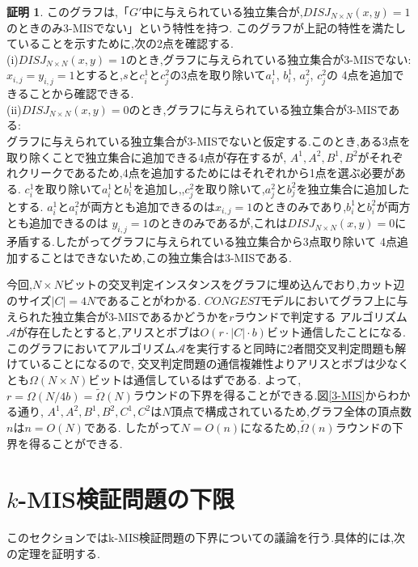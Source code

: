 \documentclass[12]{thesis}
\theoremstyle{definition}
\newtheorem*{prf*}{証明}
\begin{document}
\begin{prf*}
このグラフは,「$G'$中に与えられている独立集合が,$DISJ_{N \times N} (x, y) = 1$のときのみ3-MISでない」という特性を持つ. 
このグラフが上記の特性を満たしていることを示すために,次の2点を確認する. \\
(i)$DISJ_{N \times N} (x, y) = 1$のとき,グラフに与えられている独立集合が3-MISでない: \\
$x_{i, j} = y_{i, j} =1$とすると,$s$と$c_{i}^{1}$と$c_{j}^{2}$の3点を取り除いて$a_{i}^{1}$, $b_{i}^{1}$, $a_{j}^{2}$, $c_{j}^{2}$の
4点を追加できることから確認できる. \\
(ii)$DISJ_{N \times N} (x, y) = 0$のとき,グラフに与えられている独立集合が3-MISである: \\ 
グラフに与えられている独立集合が3-MISでないと仮定する.このとき,ある3点を取り除くことで独立集合に追加できる4点が存在するが,
$A^{1}, A^{2}, B^{1}, B^{2}$がそれぞれクリークであるため,4点を追加するためにはそれぞれから1点を選ぶ必要がある.
$c_{i}^{1}$を取り除いて$a_{i}^{1}$と$b_{i}^{1}$を追加し,,$c_{j}^{2}$を取り除いて,$a_{j}^{2}$と$b_{j}^{2}$を独立集合に追加したとする.
$a_{i}^{1}$と$a_{i}^{2}$が両方とも追加できるのは$x_{i, j} = 1$のときのみであり,$b_{i}^{1}$と$b_{i}^{2}$が両方とも追加できるのは
$y_{i, j} = 1$のときのみであるが,これは$DISJ_{N \times N} (x, y) = 0$に矛盾する.したがってグラフに与えられている独立集合から3点取り除いて
4点追加することはできないため,この独立集合は3-MISである.

今回,$N \times N$ビットの交叉判定インスタンスをグラフに埋め込んでおり,カット辺のサイズ$|C| = 4N$であることがわかる.
$CONGEST$モデルにおいてグラフ上に与えられた独立集合が3-MISであるかどうかを$r$ラウンドで判定する
アルゴリズム$\mathcal{A}$が存在したとすると,アリスとボブは$O(r \cdot |C| \cdot b)$ビット通信したことになる.
このグラフにおいてアルゴリズム$\mathcal{A}$を実行すると同時に2者間交叉判定問題も解けていることになるので,
交叉判定問題の通信複雑性よりアリスとボブは少なくとも$\Omega (N \times N)$ビットは通信しているはずである.
よって,$r = \Omega (N / 4b) = \tilde{\Omega}(N)$ラウンドの下界を得ることができる.図\ref{3-MIS}からわかる通り,
$A^{1}, A^{2}, B^{1}, B^{2}, C^{1}, C^{2}$は$N$頂点で構成されているため,グラフ全体の頂点数$n$は$n = O(N)$である.
したがって$N = O(n)$になるため,$\tilde{\Omega}(n)$ラウンドの下界を得ることができる. 
\end{prf*}
\newpage

\section{$k$-MIS検証問題の下限}
このセクションではk-MIS検証問題の下界についての議論を行う.具体的には,次の定理を証明する.
\end{document}
